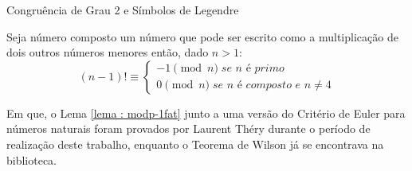 \begin{frame}[fragile]{Congruência de Grau 2 e Símbolos de Legendre}



    \begin{teorema} \label{teorema : wilson}
        Seja número composto um número que pode ser escrito como a multiplicação de dois outros números menores então, dado $n > 1$:
        \begin{equation*}
            (n - 1)! \equiv \begin{cases}
                            -1 \pmod{n} \; \textit{se $n$ é primo} \\
                            0 \pmod{n} \; \textit{se $n$ é composto e $n \neq 4$}
                            \end{cases}
        \end{equation*}
    \end{teorema}
        
    Em que, o Lema \ref{lema : modp-1fat} junto a uma versão do Critério de Euler para números naturais foram provados por Laurent Théry durante o período de realização deste trabalho, enquanto o Teorema de Wilson já se encontrava na biblioteca.

\end{frame}


